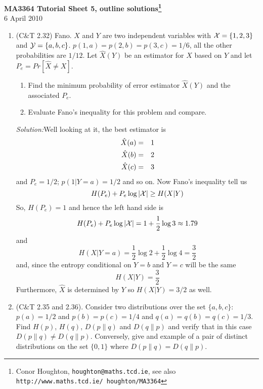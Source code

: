 \documentclass[12pt]{article}
\newcommand{\soln}{\noindent\textit{Solution:}}
\begin{document}
\begin{center}
{\bf MA3364 Tutorial Sheet 5, outline solutions\footnote{Conor Houghton, {\tt houghton@maths.tcd.ie}, see also {\tt http://www.maths.tcd.ie/ houghton/MA3364}}}\\[1cm]{} 6 April 2010
\end{center}
\begin{enumerate}

\item (C\&T 2.32) Fano. $X$ and $Y$ are two independent variables with ${\cal X}=\{1,2,3\}$ and ${\cal Y}=\{a,b,c\}$. $p(1,a)=p(2,b)=p(3,c)=1/6$, all the other probabilities are $1/12$. Let $\hat{X}(Y)$ be an estimator for $X$ based on $Y$ and let $P_e=Pr[\hat{X}\not=X]$.
\begin{enumerate}
\item Find the minimum probability of error estimator $\hat{X}(Y)$ and the associated $P_e$. 
\item Evaluate Fano's inequality for this problem and compare.
\end{enumerate}




\soln Well looking at it, the best estimator is
\begin{eqnarray}
\hat{X}(a)&=&1\cr
\hat{X}(b)&=&2\cr
\hat{X}(c)&=&3
\end{eqnarray}
and $P_e=1/2$; $p(1|Y=a)=1/2$ and so on. Now Fano's inequality tell us
\begin{equation}
H(P_e)+P_e\log{|{\cal X}|}\ge H(X|Y)
\end{equation}
So, $H(P_e)=1$ and hence the left hand side is
\begin{equation}
H(P_e)+P_e\log{|{\cal X}|}=1+\frac{1}{2}\log{3}\approx 1.79
\end{equation}
and
\begin{equation}
H(X|Y=a)=\frac{1}{2}\log{2}+\frac{1}{2}\log{4}=\frac{3}{2}
\end{equation}
and, since the entropy conditional on $Y=b$ and $Y=c$ will be the same
\begin{equation}
H(X|Y)=\frac{3}{2}
\end{equation}
Furthermore, $\hat{X}$ is determined by $Y$ so $H(X|Y)=3/2$ as well.



\item (C\&T 2.35 and 2.36). Consider two distributions over the set
  $\{a,b,c\}$: $p(a)=1/2$ and $p(b)=p(c)=1/4$ and
  $q(a)=q(b)=q(c)=1/3$. Find $H(p)$, $H(q)$, $D(p\|q)$ and $D(q\|p)$
  and verify that in this case $D(p\|q)\not=D(q\|p)$. Conversely, give
  and example of a pair of distinct distributions on the set $\{0,1\}$
  where $D(p\|q)=D(q\|p)$.



\end{enumerate}
\end{document}

